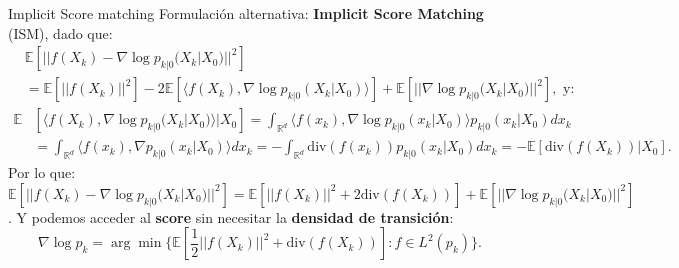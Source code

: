 \documentclass[aspectratio=169,xcolor=dvipsnames, t, spanish]{beamer}
\begin{document}
    \begin{frame}{Implicit Score matching}\vspace{-5mm}
    Formulación alternativa: \textbf{Implicit Score Matching} (ISM), dado que:
            \begin{align*}
            &\mathbb{E}[||f(X_{k})-\nabla \log p_{k|0}(X_{k}|X_{0})||^{2}] \\
            &= \mathbb{E}[||f(X_{k})||^{2}]-2\mathbb{E}[\langle f(X_{k}),\nabla \log p_{k|0}(X_{k}|X_{0})\rangle]+\mathbb{E}[||\nabla \log p_{k|0}(X_{k}|X_{0})||^{2}], \text{ y:}
            \end{align*}
            \begin{align*}
            \mathbb{E}&[\langle f(X_{k}),\nabla \log p_{k|0}(X_{k}|X_{0})\rangle|X_{0}] = \int_{\mathbb{R}^{d}}\langle f(x_{k}),\nabla \log p_{k|0}(x_{k}|X_{0})\rangle p_{k|0}(x_{k}|X_{0})dx_{k} \\
            &= \int_{\mathbb{R}^{d}}\langle f(x_{k}),\nabla p_{k|0}(x_{k}|X_{0})\rangle dx_{k} = -\int_{\mathbb{R}^{d}}\text{div}(f(x_{k}))p_{k|0}(x_{k}|X_{0})dx_{k} = -\mathbb{E}[\text{div}(f(X_{k}))|X_{0}] .
            \end{align*}
            Por lo que: $\mathbb{E}[||f(X_{k})-\nabla \log p_{k|0}(X_{k}|X_{0})||^{2}] = \mathbb{E}[||f(X_{k})||^{2}+2\text{div}(f(X_{k}))]+\mathbb{E}[||\nabla \log p_{k|0}(X_{k}|X_{0})||^{2}]$.
            Y podemos acceder al \textbf{score} sin necesitar la \textbf{densidad de transición}: %
            \[ \nabla \log p_{k}=\arg\min\{\mathbb{E}[\frac{1}{2}||f(X_{k})||^{2}+\text{div}(f(X_{k}))]:f\in L^{2}(p_{k})\} . \]
    \end{frame}
    
\end{document}
